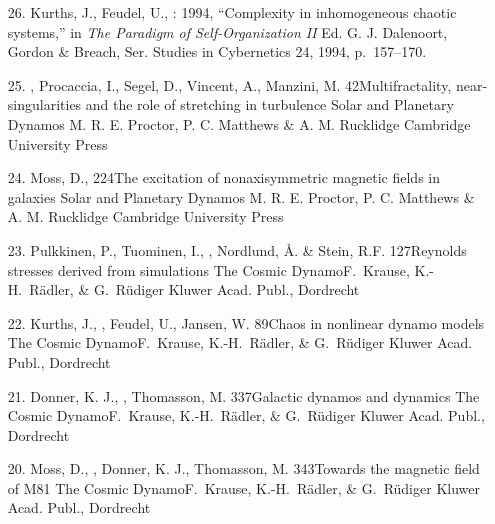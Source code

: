 \begin{itemize}
\item[26.]
Kurths, J., Feudel, U., \Brandenburg: 1994,
``Complexity in inhomogeneous chaotic systems,''
in {\em The Paradigm of Self-Organization II}
Ed. G. J. Dalenoort, Gordon \& Breach, Ser. Studies in Cybernetics 24, 1994,
p.\ 157--170.

\item[25.]
\Brandenburg, Procaccia, I., Segel, D., Vincent, A.,
Manzini, M.
{42}{Multifractality, near-singularities and the role of
stretching in turbulence}
{Solar and Planetary Dynamos}
{M. R. E. Proctor, P. C. Matthews \& A. M. Rucklidge}
{Cambridge University Press}

\item[24.]
Moss, D., \Brandenburg{}
{224}{The excitation of nonaxisymmetric magnetic fields in galaxies}
{Solar and Planetary Dynamos}
{M. R. E. Proctor, P. C. Matthews \& A. M. Rucklidge}
{Cambridge University Press}

\item[23.]
Pulkkinen, P., Tuominen, I., \Brandenburg,
Nordlund, \AA. \& Stein, R.F.
{127}{Reynolds stresses derived from simulations}
{The Cosmic Dynamo}{F.~Krause, K.-H.~R\"adler, \& G.~R\"udiger}
{Kluwer Acad. Publ., Dordrecht}

\item[22.]
Kurths, J., \Brandenburg, Feudel, U., Jansen, W.
{89}{Chaos in nonlinear dynamo models}
{The Cosmic Dynamo}{F.~Krause, K.-H.~R\"adler, \& G.~R\"udiger}
{Kluwer Acad. Publ., Dordrecht}

\item[21.]
Donner, K. J., \Brandenburg, Thomasson, M.
{337}{Galactic dynamos and dynamics}
{The Cosmic Dynamo}{F.~Krause, K.-H.~R\"adler, \& G.~R\"udiger}
{Kluwer Acad. Publ., Dordrecht}

\item[20.]
Moss, D., \Brandenburg, Donner, K. J., Thomasson, M.
{343}{Towards the magnetic field of M81}
{The Cosmic Dynamo}{F.~Krause, K.-H.~R\"adler, \& G.~R\"udiger}
{Kluwer Acad. Publ., Dordrecht}


\end{itemize}
